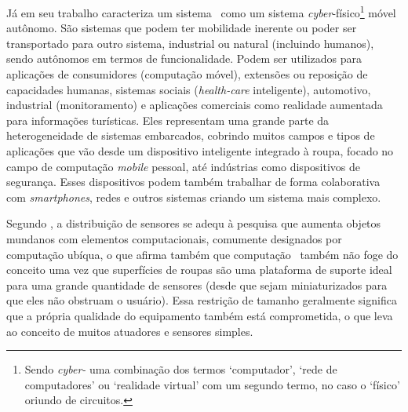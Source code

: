 		Já \cite{Jozwiak2017} em seu trabalho caracteriza um sistema \wearable\ como um sistema \textit{cyber}-físico\footnote{Sendo \textit{cyber-} uma combinação dos termos `computador', `rede de computadores' ou  `realidade virtual' com um segundo termo, no caso o `físico' oriundo de circuitos.} móvel autônomo.
        São sistemas que podem ter mobilidade inerente ou poder ser transportado para outro sistema, industrial ou natural (incluindo humanos), sendo autônomos em termos de funcionalidade.
        Podem ser utilizados para aplicações de consumidores (computação móvel), extensões ou reposição de capacidades humanas, sistemas sociais (\textit{health-care} inteligente), automotivo, industrial (monitoramento) e aplicações comerciais como realidade aumentada para informações turísticas.
		Eles representam uma grande parte da heterogeneidade de sistemas embarcados, cobrindo muitos campos e tipos de aplicações que vão desde um dispositivo inteligente integrado à roupa, focado no campo de computação \textit{mobile} pessoal, até indústrias como dispositivos de segurança. %
        Esses dispositivos podem também trabalhar de forma colaborativa com \textit{smartphones}, redes e outros sistemas criando um sistema mais complexo.

		Segundo \cite{VanLaerhoven2002}, a distribuição de sensores se adequ à pesquisa que aumenta objetos mundanos com elementos computacionais, comumente designados por computação ubíqua, o que afirma também que computação \wearable\ também não foge do conceito uma vez que superfícies de roupas são uma plataforma de suporte ideal para uma grande quantidade de sensores (desde que sejam miniaturizados para que eles não obstruam o usuário).
		Essa restrição de tamanho geralmente significa que a própria qualidade do equipamento também está comprometida, o que leva ao conceito de muitos atuadores e sensores simples.

